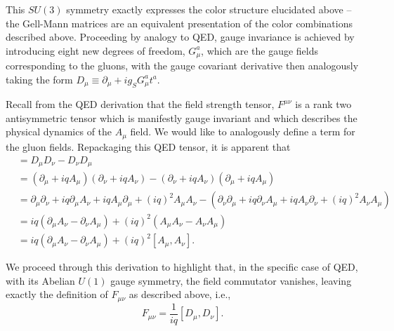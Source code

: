This $SU(3)$ symmetry exactly expresses the color structure elucidated above -- the Gell-Mann matrices are an 
equivalent presentation of the color combinations described above. Proceeding by analogy to QED, gauge invariance 
is achieved by introducing eight new degrees of freedom, $G_{\mu}^{a}$, which are the gauge fields corresponding to 
the gluons, with the gauge covariant derivative then analogously taking the form 
$D_{\mu} \equiv \partial_{\mu} + ig_{S}G_{\mu}^{a}t^{a}$.

Recall from the QED derivation that the field strength tensor, $F^{\mu\nu}$ is a rank two antisymmetric
tensor which is manifestly gauge invariant and which describes the physical dynamics of the $A_{\mu}$ field.
We would like to analogously define a term for the gluon fields. Repackaging this QED tensor, it is apparent that
\begin{align}
[D_{\mu}, D_{\nu}] &= D_{\mu}D_{\nu} - D_{\nu}D_{\mu}\\
&= (\partial_{\mu} + iqA_{\mu})(\partial_{\nu} + iqA_{\nu}) - (\partial_{\nu} + iqA_{\nu})(\partial_{\mu} + iqA_{\mu})\\
&= \partial_{\mu}\partial_{\nu}+iq\partial_{\mu}A_{\nu} + iqA_{\mu}\partial_{\mu} + (iq)^2A_{\mu}A_{\nu} -
(\partial_{\nu}\partial_{\mu}+iq\partial_{\nu}A_{\mu} + iqA_{\nu}\partial_{\nu} + (iq)^2A_{\nu}A_{\mu})\\
&=iq(\partial_{\mu}A_{\nu}-\partial_{\nu}A_{\mu}) + (iq)^2(A_{\mu}A_{\nu}-A_{\nu}A_{\mu})\\
&=iq(\partial_{\mu}A_{\nu}-\partial_{\nu}A_{\mu})+(iq)^2[A_{\mu}, A_{\nu}].
\end{align}

We proceed through this derivation to highlight that, in the specific case of QED, with its Abelian $U(1)$ gauge
symmetry, the field commutator vanishes, leaving exactly the definition of $F_{\mu\nu}$ as described above, i.e.,
\begin{equation}
F_{\mu\nu} = \frac{1}{iq}[D_{\mu}, D_{\nu}].
\end{equation}

